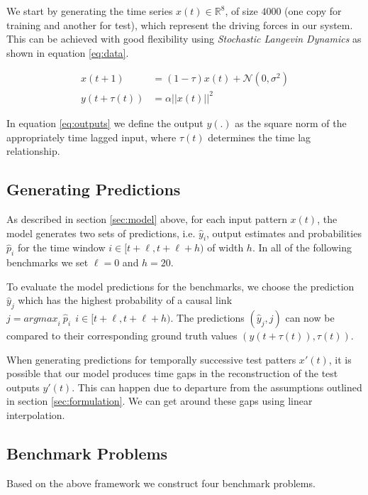 \documentclass[envcountsect,runningheads]{llncs}
\theoremstyle{etoile}
\begin{document}
We start by generating the time series $x(t) \in \mathbb{R}^8$, of size $4000$ 
(one copy for training and another for test), which represent the driving forces in our system. 
This can be achieved with good flexibility using \emph{Stochastic Langevin Dynamics} as shown in 
equation \ref{eq:data}.

\begin{align}
 x(t + 1) &= (1 - \tau) x(t) + \mathcal{N}(0, \sigma^2) \label{eq:data}\\
 y(t + \tau(t)) &= \alpha ||x(t)||^2 \label{eq:outputs}
\end{align}

In equation \ref{eq:outputs} we define the output $y(.)$ as the square norm of the appropriately 
time lagged input, where $\tau(t)$ determines the time lag relationship.

\subsection{Generating Predictions}

As described in section \ref{sec:model} above, for each input pattern $x(t)$, the model 
generates two sets of predictions, i.e. ${\hat{y}_i}$, output estimates and probabilities $\hat{p}_i$ 
for the time window $i \in [t+\ell, t+\ell+h)$ of width $h$. In all of the following benchmarks we set 
$\ell = 0$ and $h = 20$.

To evaluate the model predictions for the benchmarks, we choose the 
prediction $\hat{y}_j$ which has the highest probability of a causal link 
$j = {argmax}_{i} \ \hat{p}_i \ \ i \in [t+\ell, t+\ell+h)$. The predictions 
$(\hat{y}_j, j)$ can now be compared to their corresponding ground truth values 
$(y(t + \tau(t)), \tau(t))$. 

When generating predictions for temporally successive test patters $x'(t)$, it is possible that our 
model produces time gaps in the reconstruction of the test outputs $y'(t)$. This can happen due to 
departure from the assumptions outlined in section \ref{sec:formulation}. We can get around these 
gaps using linear interpolation.


\subsection{Benchmark Problems}\label{sec:benchmark}

Based on the above framework we construct four benchmark problems.
\end{document}
